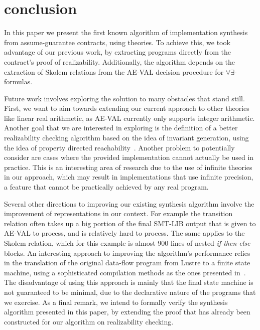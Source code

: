 \section{conclusion}
\label{sec:conclusion}

In this paper we present the first known algorithm of implementation synthesis
from assume-guarantee contracts, using theories. To achieve this, we took
advantage of our previous work, by extracting programs directly from the
contract's proof of realizability. Additionally, the algorithm depends on the
extraction of Skolem relations from the AE-VAL decision procedure for
$\forall\exists$-formulas.

Future work involves exploring the solution to many obstacles that stand still.
First, we want to aim towards extending our current approach to other theories
like linear real arithmetic, as AE-VAL currently only supports integer
arithmetic. Another goal that we are interested in exploring is the definition
of a better realizability checking algorithm based on the idea of invariant
generation, using the idea of property directed
reachability~\cite{bradley11,cimatti2014ic3,een2011efficient}. Another problem
to potentially consider are cases where the provided implementation cannot
actually be used in practice. This is an interesting area of research
due to the use of infinite theories in our approach, which may result in
implementations that use infinite precision, a feature that cannot be
practically achieved by any real program.

Several other directions to improving our existing synthesis algorithm involve
the improvement of representations in our context. For example the transition
relation often takes up a big portion of the final SMT-LIB output that is given
to AE-VAL to process, and is relatively hard to process. The same applies to the
Skolem relation, which for this example is almost 900 lines of nested
\textit{if-then-else} blocks. An interesting approach to improving the algorithm's performance relies in the translation
of the original data-flow program from Lustre to a finite state machine, using a
sophisticated compilation methods as the ones presented
in~\cite{Halbwachs91:codegen}.
The disadvantage of using this approach is mainly that the final state machine
is not guaranteed to be minimal, due to the declarative nature of the programs
that we exercise. As a final remark, we intend to formally verify the synthesis
algorithm presented in this paper, by extending the proof that has already been
constructed for our algorithm on realizability checking.
